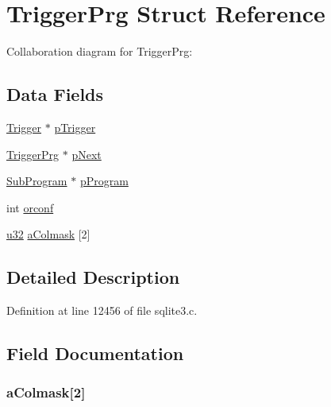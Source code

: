 \hypertarget{struct_trigger_prg}{}\section{Trigger\+Prg Struct Reference}
\label{struct_trigger_prg}


Collaboration diagram for Trigger\+Prg\+:
\subsection*{Data Fields}
\begin{DoxyCompactItemize}
\item 
\hyperlink{struct_trigger}{Trigger} $\ast$ \hyperlink{struct_trigger_prg_a93ec67e81c981e01944d8fc6ab564fec}{p\+Trigger}
\item 
\hyperlink{struct_trigger_prg}{Trigger\+Prg} $\ast$ \hyperlink{struct_trigger_prg_ae2951c8e51b34769ac3c0f0a0478c4f0}{p\+Next}
\item 
\hyperlink{struct_sub_program}{Sub\+Program} $\ast$ \hyperlink{struct_trigger_prg_a3b92cb4ee986d1dfaf28a5ade854311c}{p\+Program}
\item 
int \hyperlink{struct_trigger_prg_a46e6ed1d4c29799471bb33e2a1935986}{orconf}
\item 
\hyperlink{sqlite3_8c_a03ad5adfaeb9b7640dde78a0cc390319}{u32} \hyperlink{struct_trigger_prg_a1d04f6ca0ce0d78c842854a2d5c717b7}{a\+Colmask} \mbox{[}2\mbox{]}
\end{DoxyCompactItemize}


\subsection{Detailed Description}


Definition at line 12456 of file sqlite3.\+c.



\subsection{Field Documentation}
\hypertarget{struct_trigger_prg_a1d04f6ca0ce0d78c842854a2d5c717b7}{}
\subsubsection[{a\+Colmask}]{ a\+Colmask\mbox{[}2\mbox{]}}\label{struct_trigger_prg_a1d04f6ca0ce0d78c842854a2d5c717b7}


